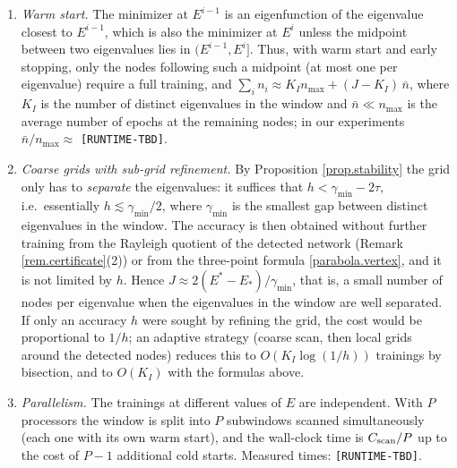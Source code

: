 \begin{enumerate}
\item \emph{Warm start.} The minimizer at $E^{i-1}$ is an eigenfunction of the eigenvalue
closest to $E^{i-1}$, which is also the minimizer at $E^i$ unless the midpoint between
two eigenvalues lies in $(E^{i-1},E^i]$. Thus, with warm start and early stopping, only
the nodes following such a midpoint (at most one per eigenvalue) require a full
training, and $\sum_in_i\approx K_In_{\max}+(J-K_I)\,\bar n$, where $K_I$ is the number
of distinct eigenvalues in the window and $\bar n\ll n_{\max}$ is the average number of
epochs at the remaining nodes; in our experiments $\bar n/n_{\max}\approx$
\texttt{[RUNTIME-TBD]}.
\item \emph{Coarse grids with sub-grid refinement.} By Proposition \ref{prop.stability}
the grid only has to \emph{separate} the eigenvalues: it suffices that
$h<\gamma_{\min}-2\tau$, i.e.\ essentially $h\lesssim\gamma_{\min}/2$, where
$\gamma_{\min}$ is the smallest gap between distinct eigenvalues in the window. The
accuracy is then obtained without further training from the Rayleigh quotient of the
detected network (Remark \ref{rem.certificate}(2)) or from the three-point formula
\eqref{parabola.vertex}, and it is not limited by $h$. Hence
$J\approx2(E^*-E_*)/\gamma_{\min}$, that is, a small number of nodes per eigenvalue when
the eigenvalues in the window are well separated. If only an accuracy $h$ were sought by
refining the grid, the cost would be proportional to $1/h$; an adaptive strategy (coarse
scan, then local grids around the detected nodes) reduces this to
$O(K_I\log(1/h))$ trainings by bisection, and to $O(K_I)$ with the formulas above.
\item \emph{Parallelism.} The trainings at different values of $E$ are independent. With
$P$ processors the window is split into $P$ subwindows scanned simultaneously (each one
with its own warm start), and the wall-clock time is $C_{\rm scan}/P$ up to the cost of
$P-1$ additional cold starts. Measured times: \texttt{[RUNTIME-TBD]}.
\end{enumerate}

